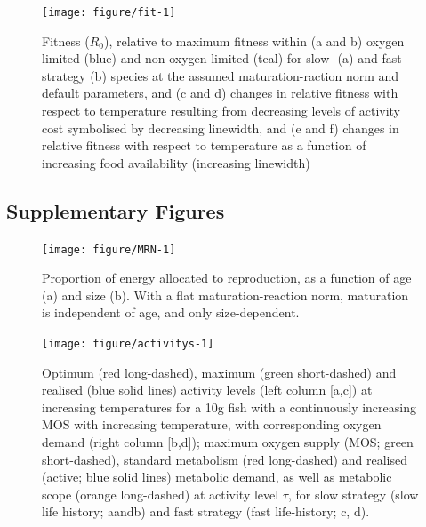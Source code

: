 \documentclass[11pt]{article}\usepackage[]{graphicx}\usepackage[]{color,soul}
\begin{document}
\begin{figure}[!ht]
{\centering 
\texttt{[image: figure/fit-1]} 
}
\caption[Fitness ($R_0$), relative to maximum fitness within (a and b) oxygen limited (blue) and non-oxygen limited (teal) for slow- (a) and fast strategy (b) species at the assumed maturation-raction norm and default parameters, and (c and d) changes in relative fitness with respect to temperature resulting from decreasing levels of activity cost symbolised by decreasing linewidth, and (e and f) changes in relative fitness with respect to temperature as a function of increasing food availability (increasing linewidth)]{Fitness ($R_0$), relative to maximum fitness within (a and b) oxygen limited (blue) and non-oxygen limited (teal) for slow- (a) and fast strategy (b) species at the assumed maturation-raction norm and default parameters, and (c and d) changes in relative fitness with respect to temperature resulting from decreasing levels of activity cost symbolised by decreasing linewidth, and (e and f) changes in relative fitness with respect to temperature as a function of increasing food availability (increasing linewidth)}\label{fig:fit}
\end{figure}


\FloatBarrier
\newpage
\subsection*{Supplementary Figures}
\renewcommand{\thefigure}{A\arabic{figure}}
\setcounter{figure}{0}

\begin{figure}[!ht]
{\centering 
\texttt{[image: figure/MRN-1]} 
}
\caption[Proportion of energy allocated to reproduction, as a function of age (a) and size (b)]{Proportion of energy allocated to reproduction, as a function of age (a) and size (b). With a flat maturation-reaction norm, maturation is independent of age, and only size-dependent.}\label{fig:MRN}
\end{figure}

\renewcommand{\thefigure}{S\arabic{figure}}
\setcounter{figure}{0}
\begin{figure}[!ht]
\centering
\texttt{[image: figure/activitys-1]} 
\caption{Optimum (red long-dashed), maximum (green short-dashed) and realised (blue solid lines) activity levels (left column [a,c]) at increasing temperatures for a 10g fish with a continuously increasing MOS with increasing temperature, with corresponding oxygen demand (right column [b,d]); maximum oxygen supply (MOS; green short-dashed), standard metabolism (red long-dashed) and realised (active; blue solid lines) metabolic demand, as well as metabolic scope (orange long-dashed) at activity level $\tau$, for slow strategy (slow life history; aandb) and fast strategy (fast life-history; c, d).}
\label{fig:activity-rising}
\end{figure}
\end{document}

